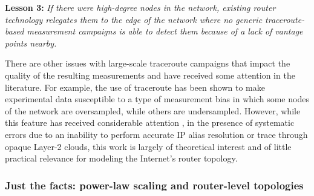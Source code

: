 {\bf Lesson 3:} {\em If there were high-degree nodes in the network,
existing router technology relegates them to the edge of the network
where no generic traceroute-based measurement campaigns is able to
detect them because of a lack of vantage points nearby.}

There are other issues with large-scale traceroute campaigns that
impact the quality of the resulting measurements and have received
some attention in the literature.  For example, the use of traceroute
has been shown to make experimental data susceptible to a type of
measurement bias in which some nodes of the network are oversampled,
while others are undersampled. However, while this feature has
received considerable attention
\cite{LakhinaByersCrovellaXie03,achlioptas05:_bias_of_tracer_sampl},
in the presence of systematic errors due to an inability to perform
accurate IP alias resolution or trace through opaque Layer-2 clouds,
this work is largely of theoretical interest and of little practical
relevance for modeling the Internet's router topology.







\subsubsection{Just the facts: power-law scaling and router-level topologies}

